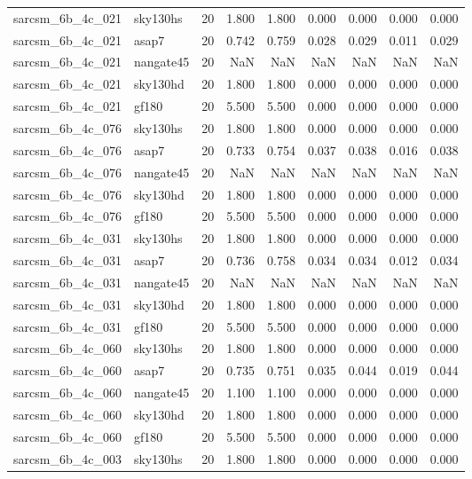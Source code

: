 \begin{tabular}{llrrrrrrr}
sarcsm\_6b\_4c\_021 & sky130hs & 20 & 1.800 & 1.800 & 0.000 & 0.000 & 0.000 & 0.000 \\
sarcsm\_6b\_4c\_021 & asap7 & 20 & 0.742 & 0.759 & 0.028 & 0.029 & 0.011 & 0.029 \\
sarcsm\_6b\_4c\_021 & nangate45 & 20 & NaN & NaN & NaN & NaN & NaN & NaN \\
sarcsm\_6b\_4c\_021 & sky130hd & 20 & 1.800 & 1.800 & 0.000 & 0.000 & 0.000 & 0.000 \\
sarcsm\_6b\_4c\_021 & gf180 & 20 & 5.500 & 5.500 & 0.000 & 0.000 & 0.000 & 0.000 \\
sarcsm\_6b\_4c\_076 & sky130hs & 20 & 1.800 & 1.800 & 0.000 & 0.000 & 0.000 & 0.000 \\
sarcsm\_6b\_4c\_076 & asap7 & 20 & 0.733 & 0.754 & 0.037 & 0.038 & 0.016 & 0.038 \\
sarcsm\_6b\_4c\_076 & nangate45 & 20 & NaN & NaN & NaN & NaN & NaN & NaN \\
sarcsm\_6b\_4c\_076 & sky130hd & 20 & 1.800 & 1.800 & 0.000 & 0.000 & 0.000 & 0.000 \\
sarcsm\_6b\_4c\_076 & gf180 & 20 & 5.500 & 5.500 & 0.000 & 0.000 & 0.000 & 0.000 \\
sarcsm\_6b\_4c\_031 & sky130hs & 20 & 1.800 & 1.800 & 0.000 & 0.000 & 0.000 & 0.000 \\
sarcsm\_6b\_4c\_031 & asap7 & 20 & 0.736 & 0.758 & 0.034 & 0.034 & 0.012 & 0.034 \\
sarcsm\_6b\_4c\_031 & nangate45 & 20 & NaN & NaN & NaN & NaN & NaN & NaN \\
sarcsm\_6b\_4c\_031 & sky130hd & 20 & 1.800 & 1.800 & 0.000 & 0.000 & 0.000 & 0.000 \\
sarcsm\_6b\_4c\_031 & gf180 & 20 & 5.500 & 5.500 & 0.000 & 0.000 & 0.000 & 0.000 \\
sarcsm\_6b\_4c\_060 & sky130hs & 20 & 1.800 & 1.800 & 0.000 & 0.000 & 0.000 & 0.000 \\
sarcsm\_6b\_4c\_060 & asap7 & 20 & 0.735 & 0.751 & 0.035 & 0.044 & 0.019 & 0.044 \\
sarcsm\_6b\_4c\_060 & nangate45 & 20 & 1.100 & 1.100 & 0.000 & 0.000 & 0.000 & 0.000 \\
sarcsm\_6b\_4c\_060 & sky130hd & 20 & 1.800 & 1.800 & 0.000 & 0.000 & 0.000 & 0.000 \\
sarcsm\_6b\_4c\_060 & gf180 & 20 & 5.500 & 5.500 & 0.000 & 0.000 & 0.000 & 0.000 \\
sarcsm\_6b\_4c\_003 & sky130hs & 20 & 1.800 & 1.800 & 0.000 & 0.000 & 0.000 & 0.000 \\

\end{tabular}
